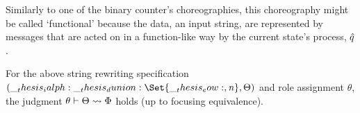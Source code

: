 Similarly to one of the binary counter's choreographies, this choreography might be called \enquote*{functional} because the data, an input string, are represented by messages that are acted on in a function-like way by the current state's process, $\hat{q}$.

\begin{proposition}\label{prop:formula-as-process:nfa-functional-chorsig}
  For the above string rewriting specification $(\ialph \dunion \Set{\eow, \symrej}, \srsig)$ and role assignment $\theta$, the judgment $\theta \vdash \Theta \rightsquigarrow \Phi$ holds (up to focusing equivalence).
\end{proposition}

